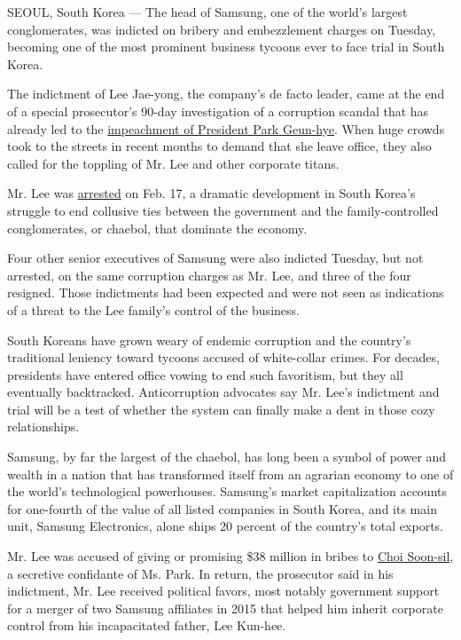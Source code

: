SEOUL, South Korea --- The head of Samsung, one of the world's largest
conglomerates, was indicted on bribery and embezzlement charges on
Tuesday, becoming one of the most prominent business tycoons ever to
face trial in South Korea.

The indictment of Lee Jae-yong, the company's de facto leader, came at
the end of a special prosecutor's 90-day investigation of a corruption
scandal that has already led to the
\href{https://www.nytimes.com/2016/12/08/world/asia/south-korea-park-geun-hye-accusations-impeachment.html}{impeachment
of President Park Geun-hye}. When huge crowds took to the streets in
recent months to demand that she leave office, they also called for the
toppling of Mr. Lee and other corporate titans.

Mr. Lee was
\href{https://www.nytimes.com/2017/02/16/world/asia/korea-samsung-lee-jae-yong.html}{arrested}
on Feb. 17, a dramatic development in South Korea's struggle to end
collusive ties between the government and the family-controlled
conglomerates, or chaebol, that dominate the economy.

Four other senior executives of Samsung were also indicted Tuesday, but
not arrested, on the same corruption charges as Mr. Lee, and three of
the four resigned. Those indictments had been expected and were not seen
as indications of a threat to the Lee family's control of the business.

South Koreans have grown weary of endemic corruption and the country's
traditional leniency toward tycoons accused of white-collar crimes. For
decades, presidents have entered office vowing to end such favoritism,
but they all eventually backtracked. Anticorruption advocates say Mr.
Lee's indictment and trial will be a test of whether the system can
finally make a dent in those cozy relationships.

Samsung, by far the largest of the chaebol, has long been a symbol of
power and wealth in a nation that has transformed itself from an
agrarian economy to one of the world's technological powerhouses.
Samsung's market capitalization accounts for one-fourth of the value of
all listed companies in South Korea, and its main unit, Samsung
Electronics, alone ships 20 percent of the country's total exports.

Mr. Lee was accused of giving or promising \$38 million in bribes to
\href{https://www.nytimes.com/2016/11/01/world/asia/south-korea-park-geun-hye-choi-soon-sil.html}{Choi
Soon-sil}, a secretive confidante of Ms. Park. In return, the prosecutor
said in his indictment, Mr. Lee received political favors, most notably
government support for a merger of two Samsung affiliates in 2015 that
helped him inherit corporate control from his incapacitated father, Lee
Kun-hee.

